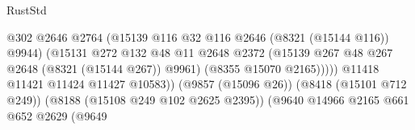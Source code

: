 \begin{lexlean}{RustStd}
\begin{coremodule}
                                                          @302
                                                          @2646
                                                          @2764
                                                          (@15139
                                                            @116
                                                            @32
                                                            @116
                                                            @2646
                                                            (@8321 (@15144 @116))
                                                            @9944)
                                                          (@15131
                                                            @272
                                                            @132
                                                            @48
                                                            @11
                                                            @2648
                                                            @2372
                                                            (@15139
                                                              @267
                                                              @48
                                                              @267
                                                              @2648
                                                              (@8321 (@15144 @267))
                                                              @9961)
                                                            (@8355 @15070 @2165)))))
                                                    @11418
                                                    @11421
                                                    @11424
                                                    @11427
                                                    @10583))
                                                (@9857 (@15096 @26))
                                                (@8418 (@15101 @712 @249))
                                                (@8188 (@15108 @249 @102 @2625 @2395))
                                                (@9640
                                                  @14966
                                                  @2165
                                                  @661
                                                  @652
                                                  @2629
                                                  (@9649

\end{coremodule}
\end{lexlean}
